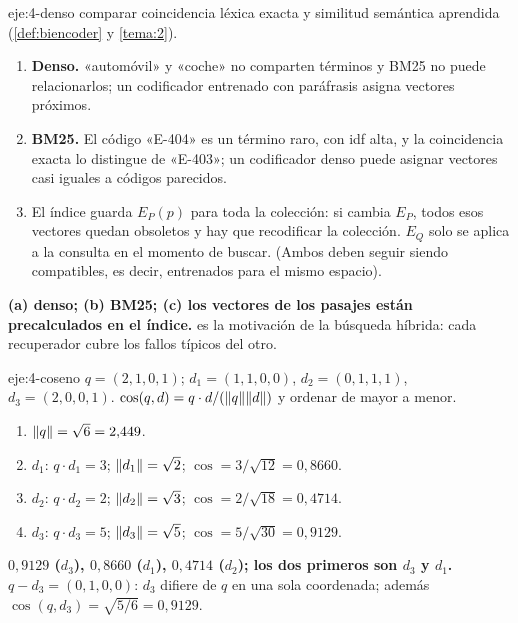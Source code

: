\begin{solucion}{eje:4-denso}
\planteamiento comparar coincidencia léxica exacta y similitud semántica aprendida (\cref{def:biencoder} y \cref{tema:2}).
\pasos
\begin{enumerate}[label=(\alph*)]
  \item \textbf{Denso.} «automóvil» y «coche» no comparten términos y BM25 no puede relacionarlos; un codificador entrenado con paráfrasis asigna vectores próximos.
  \item \textbf{BM25.} El código «E-404» es un término raro, con idf alta, y la coincidencia exacta lo distingue de «E-403»; un codificador denso puede asignar vectores casi iguales a códigos parecidos.
  \item El índice guarda $E_P(p)$ para toda la colección: si cambia $E_P$, todos esos vectores quedan obsoletos y hay que recodificar la colección. $E_Q$ solo se aplica a la consulta en el momento de buscar. (Ambos deben seguir siendo compatibles, es decir, entrenados para el mismo espacio).
\end{enumerate}
\resultado \textbf{(a) denso; (b) BM25; (c) los vectores de los pasajes están precalculados en el índice.}
\comprobacion es la motivación de la búsqueda híbrida: cada recuperador cubre los fallos típicos del otro.
\end{solucion}

\begin{solucion}{eje:4-coseno}
\datos $q=(2,1,0,1)$; $d_1=(1,1,0,0)$, $d_2=(0,1,1,1)$, $d_3=(2,0,0,1)$.
\planteamiento $\cos(q,d)=q\cdot d/(\lVert q\rVert\lVert d\rVert)$ y ordenar de mayor a menor.
\pasos
\begin{enumerate}[label=\arabic*.]
  \item $\lVert q\rVert=\sqrt6=2{,}449$.
  \item $d_1$: $q\cdot d_1=3$; $\lVert d_1\rVert=\sqrt2$; $\cos=3/\sqrt{12}=0{,}8660$.
  \item $d_2$: $q\cdot d_2=2$; $\lVert d_2\rVert=\sqrt3$; $\cos=2/\sqrt{18}=0{,}4714$.
  \item $d_3$: $q\cdot d_3=5$; $\lVert d_3\rVert=\sqrt5$; $\cos=5/\sqrt{30}=0{,}9129$.
\end{enumerate}
\resultado \textbf{$0{,}9129$ ($d_3$), $0{,}8660$ ($d_1$), $0{,}4714$ ($d_2$); los dos primeros son $d_3$ y $d_1$.}
\comprobacion $q-d_3=(0,1,0,0)$: $d_3$ difiere de $q$ en una sola coordenada; además $\cos(q,d_3)=\sqrt{5/6}=0{,}9129$.
\end{solucion}

